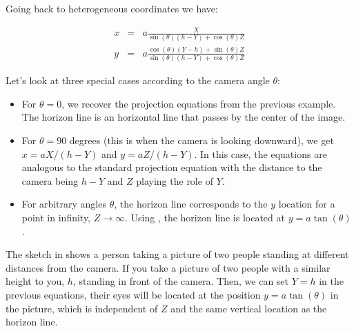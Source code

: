 Going back to heterogeneous coordinates we have:

\begin{eqnarray}
x &=& a \frac{X}{\sin( \theta ) (h-Y) + \cos ( \theta ) Z} \\
y &=& a \frac{\cos (\theta) (Y-h) + \sin(\theta)Z}{\sin( \theta ) (h-Y) + \cos ( \theta ) Z} \label{eqn:model3camera}
\end{eqnarray}

Let's look at three special cases according to the camera angle $\theta$:
\begin{itemize}
\item For $\theta=0$, we recover the projection equations from the previous example. The horizon line is an horizontal line that passes by the center of the image. 

\item For $\theta=90$ degrees (this is when the camera is looking downward), we get $x=a X / (h-Y)$ and $y=a Z/(h-Y)$. In this case, the equations are analogous to the standard projection equation with the distance to the camera being $h-Y$ and $Z$ playing the role of $Y$.

\item For arbitrary angles $\theta$, 
the horizon line corresponds to the $y$ location for a point in infinity, $Z \rightarrow \infty$. Using \eqn{\ref{eqn:model3camera}}, the horizon line is located at $y = a \tan(\theta)$.  
\end{itemize}

The sketch in \fig{\ref{fig:sketch_eyes_location}} shows a person taking a picture of two people standing at different distances from the camera. If you take a picture of two people with a similar height to you, $h$, standing in front of the camera. Then, we can set $Y=h$ in the previous equations, their eyes will be located at the position $y = a \tan(\theta)$ in the picture, which is independent of $Z$ and the same vertical location as the horizon line. 

